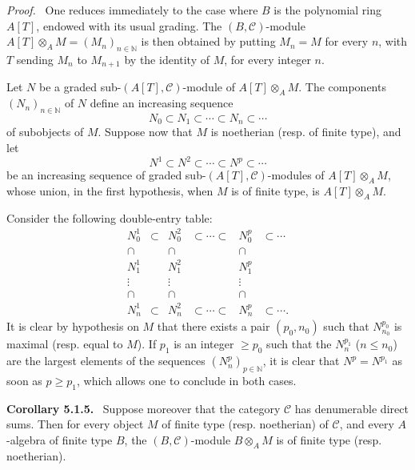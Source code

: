 \documentclass[11pt]{article}
\newenvironment{statement}[1]{\par\medskip\noindent\textbf{#1.}\ }{\par\medskip}
\newenvironment{prooftext}[1][Proof]{\par\noindent\emph{#1.}\ }{\par\medskip}
\begin{document}
\begin{prooftext}
One reduces immediately to the case where \(B\) is the polynomial ring \(A[T]\), endowed with its usual grading. The \((B,\mathcal C)\)-module \(A[T]\otimes_A M=(M_n)_{n\in\mathbb N}\) is then obtained by putting \(M_n=M\) for every \(n\), with \(T\) sending \(M_n\) to \(M_{n+1}\) by the identity of \(M\), for every integer \(n\).

Let \(N\) be a graded sub-\((A[T],\mathcal C)\)-module of \(A[T]\otimes_A M\). The components \((N_n)_{n\in\mathbb N}\) of \(N\) define an increasing sequence
\[
N_0\subset N_1\subset\cdots\subset N_n\subset\cdots
\]
of subobjects of \(M\). Suppose now that \(M\) is noetherian (resp. of finite type), and let
\[
N^1\subset N^2\subset\cdots\subset N^p\subset\cdots
\]
be an increasing sequence of graded sub-\((A[T],\mathcal C)\)-modules of \(A[T]\otimes_A M\), whose union, in the first hypothesis, when \(M\) is of finite type, is \(A[T]\otimes_A M\).

Consider the following double-entry table:
\[
\begin{array}{cccccc}
N_0^1&\subset&N_0^2&\subset\cdots\subset&N_0^p&\subset\cdots\\
\cap&&\cap&&\cap\\
N_1^1&&N_1^2&&N_1^p\\
\vdots&&\vdots&&\vdots\\
\cap&&\cap&&\cap\\
N_n^1&\subset&N_n^2&\subset\cdots\subset&N_n^p&\subset\cdots .
\end{array}
\]
It is clear by hypothesis on \(M\) that there exists a pair \((p_0,n_0)\) such that \(N^{p_0}_{n_0}\) is maximal (resp. equal to \(M\)). If \(p_1\) is an integer \(\ge p_0\) such that the \(N_n^{p_1}\) (\(n\le n_0\)) are the largest elements of the sequences \((N_n^p)_{p\in\mathbb N}\), it is clear that \(N^p=N^{p_1}\) as soon as \(p\ge p_1\), which allows one to conclude in both cases.
\end{prooftext}

\label{sga5:V:corollary:5.1.5}\begin{statement}{Corollary 5.1.5}
Suppose moreover that the category \(\mathcal C\) has denumerable direct sums. Then for every object \(M\) of finite type (resp. noetherian) of \(\mathcal C\), and every \(A\)-algebra of finite type \(B\), the \((B,\mathcal C)\)-module \(B\otimes_A M\) is of finite type (resp. noetherian).
\end{statement}
\end{document}
